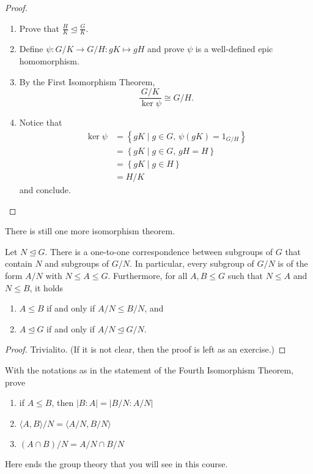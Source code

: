 \documentclass[11pt,a4paper]{article}
\begin{document}
\begin{proof}
\begin{enumerate}[label=(\roman*)]
    \item Prove that \(\frac{H}{K}  \unlhd \frac{G}{K}\).
    \item Define \(\psi\colon G/K \to G/H: gK \mapsto gH\) and prove \(\psi\) is a well-defined epic homomorphism.
    \item By the First Isomorphism Theorem, \[\frac{G/K}{\ker \psi}\cong G/H.\]
    \item Notice that 
    \begin{align*}
        \ker \psi &= \left\{ gK \mid g\in G,\, \psi (gK) = 1_{G/H} \right\}\\
        &= \left\{ gK \mid g\in G,\, g H = H \right\}\\
        &= \left\{ gK \mid g\in H \right\}\\
        &= H / K    
    \end{align*}
    and conclude.
\end{enumerate}
\end{proof}

There is still one more isomorphism theorem.

\begin{cor}
Let  \(N\unlhd G\).
There is a one-to-one correspondence between subgroups of \(G\) that contain \(N\) and subgroups of \(G/N\).
In particular, every subgroup of \(G/N\) is of the form \(A/N\) with \(N\leq A\leq G\).
Furthermore, for all \(A,B\leq G\) such that \(N\leq A\) and \(N\leq B\), it holds
\begin{enumerate}[label=(\roman*)]
    \item \(A\leq B\) if and only if \(A/N \leq B/N\), and 
    \item \(A\unlhd G\) if and only if \(A/N\unlhd G/N\).
\end{enumerate}
\end{cor}

\begin{proof}
    Trivialito. (If it is not clear, then the proof is left as  an exercise.)
\end{proof}

\begin{eje}
With the notations as in the statement of the Fourth Isomorphism Theorem, prove 
\begin{enumerate}[label=(\roman*)]
    \item if \(A\leq B\), then \(|B:A| = |B/N : A/ N|\)
    \item \({\langle A,B  \rangle} / N = \langle A/N, B/N \rangle \)
    \item \(({A\cap B})/N = A / N \cap B/ N\)
\end{enumerate}
\end{eje}

Here ends  the group theory that you will see in  this course.
\end{document}

